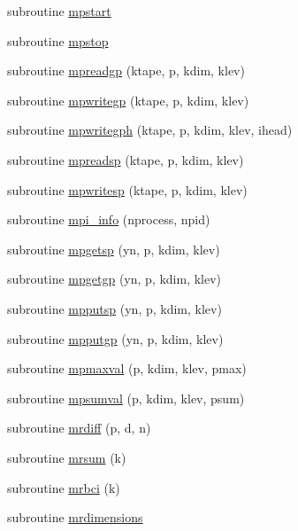 \begin{DoxyCompactItemize}
\item 
subroutine \hyperlink{mpimod_8f90_a41bbd9334a3d0412c73399d699bbb237}{mpstart}
\item 
subroutine \hyperlink{mpimod_8f90_ac80e83b9bc0a4b459fed5f3b79cfafa0}{mpstop}
\item 
subroutine \hyperlink{mpimod_8f90_a463456bde27045e2cf286e6e6082b9aa}{mpreadgp} (ktape, p, kdim, klev)
\item 
subroutine \hyperlink{mpimod_8f90_a3e3ab4b6cd8d7863f7bfc0e74b370488}{mpwritegp} (ktape, p, kdim, klev)
\item 
subroutine \hyperlink{mpimod_8f90_a325e1b8f8412b422a06fb7558f212f7e}{mpwritegph} (ktape, p, kdim, klev, ihead)
\item 
subroutine \hyperlink{mpimod_8f90_a4aceba15459fefd864a0ed3313b0073d}{mpreadsp} (ktape, p, kdim, klev)
\item 
subroutine \hyperlink{mpimod_8f90_aca5ad2279542f783c1d862333da96744}{mpwritesp} (ktape, p, kdim, klev)
\item 
subroutine \hyperlink{mpimod_8f90_aa6e5f06de5db1764ec5ee24c21bae378}{mpi\-\_\-info} (nprocess, npid)
\item 
subroutine \hyperlink{mpimod_8f90_acf82ae878fff75151cab59cdd0925ae0}{mpgetsp} (yn, p, kdim, klev)
\item 
subroutine \hyperlink{mpimod_8f90_a58d54c2e0590e63a7459417831afe5cf}{mpgetgp} (yn, p, kdim, klev)
\item 
subroutine \hyperlink{mpimod_8f90_a79c341b7b52bf44470898581072660b8}{mpputsp} (yn, p, kdim, klev)
\item 
subroutine \hyperlink{mpimod_8f90_a7e675330db7b46cf0bf0cc8edd2d413c}{mpputgp} (yn, p, kdim, klev)
\item 
subroutine \hyperlink{mpimod_8f90_a1b6ac2b98059a43359ac0edfeb9c2ad7}{mpmaxval} (p, kdim, klev, pmax)
\item 
subroutine \hyperlink{mpimod_8f90_ac1dfb34daad89cf72ff04b6a58919b2b}{mpsumval} (p, kdim, klev, psum)
\item 
subroutine \hyperlink{mpimod_8f90_af3212261e3ce775f26d09859c337b760}{mrdiff} (p, d, n)
\item 
subroutine \hyperlink{mpimod_8f90_a5d2bb9cfe68e5feb6de6b359f04398e3}{mrsum} (k)
\item 
subroutine \hyperlink{mpimod_8f90_ab1311e17e35732047db4b93e1bb6c984}{mrbci} (k)
\item 
subroutine \hyperlink{mpimod_8f90_acb4a2403b5f65a70e7e5ff01ea4577f7}{mrdimensions}
\end{DoxyCompactItemize}


